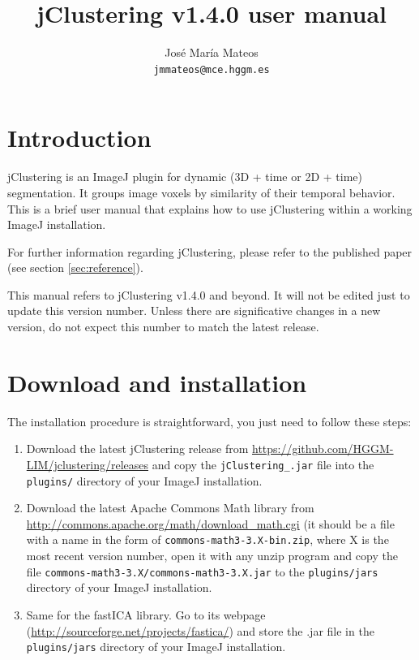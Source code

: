 \documentclass[11pt]{article} %
\title{jClustering v1.4.0 user manual}
\author{José María Mateos \\ \texttt{jmmateos@mce.hggm.es}}
\begin{document}
\maketitle

\tableofcontents

\section{Introduction}

jClustering is an ImageJ plugin for dynamic (3D + time or 2D + time) segmentation. It groups
image voxels by similarity of their temporal behavior. This is a brief user manual that explains
how to use jClustering within a working ImageJ installation.

For further information regarding jClustering, please refer to the published paper (see section \ref{sec:reference}).

This manual refers to jClustering v1.4.0 and beyond. It will not be edited just to update this version number. Unless
there are significative changes in a new version, do not expect this number to match the latest release.

\section{Download and installation}

The installation procedure is straightforward, you just need to follow these steps:

\begin{enumerate}
\item Download the latest jClustering release from \url{https://github.com/HGGM-LIM/jclustering/releases} and copy the 
\texttt{jClustering\_.jar} file into the \texttt{plugins/} directory of your ImageJ installation.

\item Download the latest Apache Commons Math library from \url{http://commons.apache.org/math/download_math.cgi}
(it should be a file with a name in the form of \texttt{commons-math3-3.X-bin.zip}, where X is the most recent version number,
open it with any unzip program and copy the file \texttt{commons-math3-3.X/commons-math3-3.X.jar} to the 
\texttt{plugins/jars} directory of your ImageJ installation.

\item Same for the fastICA library. Go to its webpage (\url{http://sourceforge.net/projects/fastica/}) and store the .jar file
in the \texttt{plugins/jars} directory of your ImageJ installation.
\end{enumerate}
\end{document}
